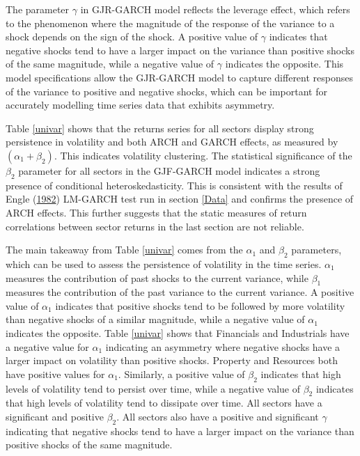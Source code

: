 \documentclass[11pt,preprint, authoryear]{elsarticle}
\numberwithin{equation}{section}
\numberwithin{figure}{section}
\numberwithin{table}{section}
\begin{document}
The parameter \(\gamma\) in GJR-GARCH model reflects the leverage
effect, which refers to the phenomenon where the magnitude of the
response of the variance to a shock depends on the sign of the shock. A
positive value of \(\gamma\) indicates that negative shocks tend to have
a larger impact on the variance than positive shocks of the same
magnitude, while a negative value of \(\gamma\) indicates the opposite.
This model specifications allow the GJR-GARCH model to capture different
responses of the variance to positive and negative shocks, which can be
important for accurately modelling time series data that exhibits
asymmetry.

Table \ref{univar} shows that the returns series for all sectors display
strong persistence in volatility and both ARCH and GARCH effects, as
measured by \((\alpha_1 + \beta_2 )\). This indicates volatility
clustering. The statistical significance of the \(\beta_2\) parameter
for all sectors in the GJF-GARCH model indicates a strong presence of
conditional heteroskedasticity. This is consistent with the results of
Engle (\protect\hyperlink{ref-engle}{1982}) LM-GARCH test run in section
\ref{Data} and confirms the presence of ARCH effects. This further
suggests that the static measures of return correlations between sector
returns in the last section are not reliable.

The main takeaway from Table \ref{univar} comes from the \(\alpha_1\)
and \(\beta_2\) parameters, which can be used to assess the persistence
of volatility in the time series. \(\alpha_1\) measures the contribution
of past shocks to the current variance, while \(\beta_1\) measures the
contribution of the past variance to the current variance. A positive
value of \(\alpha_1\) indicates that positive shocks tend to be followed
by more volatility than negative shocks of a similar magnitude, while a
negative value of \(\alpha_1\) indicates the opposite. Table
\ref{univar} shows that Financials and Industrials have a negative value
for \(\alpha_1\) indicating an asymmetry where negative shocks have a
larger impact on volatility than positive shocks. Property and Resources
both have positive values for \(\alpha_1\). Similarly, a positive value
of \(\beta_2\) indicates that high levels of volatility tend to persist
over time, while a negative value of \(\beta_2\) indicates that high
levels of volatility tend to dissipate over time. All sectors have a
significant and positive \(\beta_2\). All sectors also have a positive
and significant \(\gamma\) indicating that negative shocks tend to have
a larger impact on the variance than positive shocks of the same
magnitude.
\end{document}

